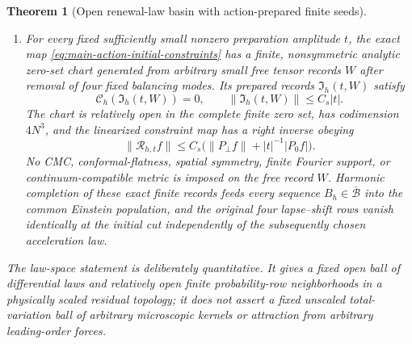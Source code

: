 \documentclass[11pt]{article}
\newtheorem{theorem}{Theorem}[section]
\theoremstyle{definition}
\theoremstyle{remark}
\begin{document}
\begin{theorem}[Open renewal-law basin with action-prepared finite seeds]
\begin{enumerate}[label=\textup{(L\arabic*)},leftmargin=3em]
      At each fixed cutoff and grammar the strict conditions
      \eqref{eq:main-law-row-moment} form nonempty relatively open convex
      subsets of the product of row simplexes, and may contain strictly
      positive rows.  Along the odd refinement sequence the exceptional
      probabilities are summable, so under any common coupling the Einstein
      conclusion holds eventually almost surely.
\item For every fixed sufficiently small nonzero preparation amplitude $t$,
      the exact map \eqref{eq:main-action-initial-constraints} has a finite,
      nonsymmetric analytic zero-set chart generated from arbitrary small free
      tensor records $W$ after removal of four fixed balancing modes.  Its
      prepared records $\mathfrak I_h(t,W)$ satisfy
      \begin{equation}
       \boxed{\mathscr C_h(\mathfrak I_h(t,W))=0,\qquad
       \|\mathfrak I_h(t,W)\|\le C_s|t|.}
       \label{eq:main-action-prepared-zero}
      \end{equation}
      The chart is relatively open in the complete finite zero set, has
      codimension $4N^3$, and the linearized constraint map has a right inverse
      obeying
      \begin{equation}
       \|\mathscr R_{h,t}f\|
       \le C_s\bigl(\|P_\perp f\|+|t|^{-1}|P_0f|\bigr).
       \label{eq:main-action-prepared-inverse}
      \end{equation}
      No CMC, conformal-flatness, spatial symmetry, finite Fourier support, or
      continuum-compatible metric is imposed on the free record $W$.
      Harmonic completion of these exact finite records feeds every sequence
      $B_h\in\overline{\mathcal B}$ into the common Einstein population, and
      the original four lapse--shift rows vanish identically at the initial
      cut independently of the subsequently chosen acceleration law.
\end{enumerate}
The law-space statement is deliberately quantitative.  It gives a fixed open
ball of differential laws and relatively open finite probability-row
neighborhoods in a physically scaled residual topology; it does not assert a
fixed unscaled total-variation ball of arbitrary microscopic kernels or
attraction from arbitrary leading-order forces.
\end{theorem}
\end{document}
